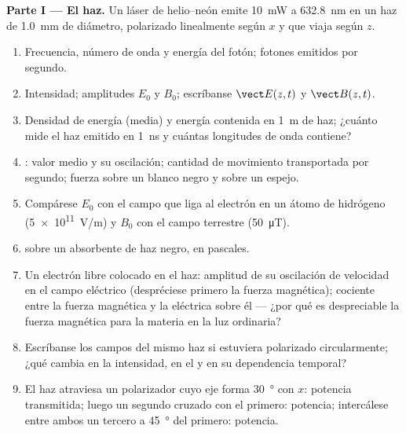 \begin{problem}
\label{pb:b2:plane-waves-polarization:1}

\medskip
\noindent\textbf{Parte I --- El haz.}
Un láser de helio--neón emite \qty{10}{mW} a \qty{632.8}{nm} en un haz de
\qty{1.0}{mm} de diámetro, polarizado linealmente según $x$ y que viaja
según $z$.
\begin{enumerate}
  \item Frecuencia, número de onda y energía del fotón; fotones emitidos
        por segundo.
  \item Intensidad; amplitudes $E_0$ y $B_0$; escríbanse $\vect E(z, t)$ y
        $\vect B(z, t)$.
  \item Densidad de energía (media) y energía contenida en \qty{1}{m} de
        haz; ¿cuánto mide el haz emitido en \qty{1}{ns} y cuántas
        longitudes de onda contiene?
  \item {}: valor medio y su oscilación; cantidad de
        movimiento transportada por segundo; fuerza sobre un blanco negro
        y sobre un espejo.
  \item Compárese $E_0$ con el campo que liga al electrón en un átomo de
        hidrógeno (\qty{5e11}{V/m}) y $B_0$ con el campo terrestre
        (\qty{50}{\micro T}).
  \item {} sobre un absorbente de haz negro, en
        pascales.
  \item Un electrón libre colocado en el haz: amplitud de su oscilación de
        velocidad en el campo eléctrico (despréciese primero la fuerza
        magnética); cociente entre la fuerza magnética y la eléctrica
        sobre él --- ¿por qué es despreciable la fuerza magnética para la
        materia en la luz ordinaria?
  \item Escríbanse los campos del mismo haz si estuviera polarizado
        circularmente; ¿qué cambia en la intensidad, en el  y en su dependencia temporal?
  \item El haz atraviesa un polarizador cuyo eje forma \qty{30}{\degree} con
        $x$: potencia transmitida; luego un segundo cruzado con el
        primero: potencia; intercálese entre ambos un tercero a
        \qty{45}{\degree} del primero: potencia.
\end{enumerate}


\end{problem}
